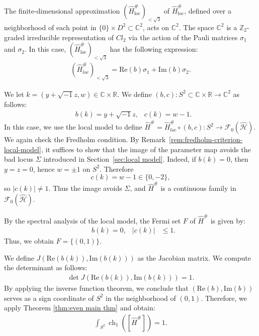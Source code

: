 \documentclass{amsart}
\theoremstyle{definition}
\theoremstyle{remark}
\begin{document}
The finite-dimensional approximation $(\hat{H}^{\#}_{\mathrm{loc}})_{<\sqrt{3}}$ of $\hat{H}^{\#}_{\mathrm{loc}}$, defined over a neighborhood of each point in $\{0\} \times D^2 \subset \mathbb{C}^2$, acts on $\mathbb{C}^2$. The space $\mathbb{C}^2$ is a $\mathbb{Z}_2$-graded irreducible representation of $Cl_2$ via the action of the Pauli matrices $\sigma_1$ and $\sigma_2$. In this case, $(\hat{H}^{\#}_{\mathrm{loc}})_{<\sqrt{3}}$ has the following expression:
\begin{align*}
    (\hat{H}^{\#}_{loc})_{<\sqrt{3}} = \text{Re}(b) \sigma_1 + \text{Im}(b) \sigma_2.
\end{align*}

We let $k = (y + \sqrt{-1} z, w) \in \mathbb{C} \times \mathbb{R}$.
We define $(b, c) \colon S^2 \subset \mathbb{C} \times \mathbb{R} \to \mathbb{C}^2$ as follows:
\begin{align*}
    &b(k) = y + \sqrt{-1} z, &c(k) = w - 1.
\end{align*}
In this case, we use the local model to define $\hat{H}^{\#} = \hat{H}^{\#}_{loc} \circ (b, c) \colon S^2 \to \mathcal{F}_0(\hat{\mathcal{H}})$.
We again check the Fredholm condition.
By Remark~\ref{rem:fredholm-criterion-local-model}, it suffices to show that the image of
the parameter map avoids the bad locus $\Sigma$ introduced in Section~\ref{sec:local model}.
Indeed, if $b(k)=0$, then $y=z=0$, hence $w=\pm 1$ on $S^2$.
Therefore
\[
c(k)=w-1\in\{0,-2\},
\]
so $|c(k)|\neq 1$.
Thus the image avoids $\Sigma$, and $\hat H^\#$ is a continuous family in
$\mathcal F_0(\hat{\mathcal H})$.

By the spectral analysis of the local model, the Fermi set $F$ of $\hat{H}^{\#}$ is given by:
\begin{align*}
    &b(k)= 0, &\lvert c(k) \rvert &\leq 1.
\end{align*}
Thus, we obtain $F = \{(0, 1)\}$.

We define $J(\text{Re}(b(k)), \text{Im}(b(k)))$ as the Jacobian matrix.
We compute the determinant as follows:
\begin{align*}
    \det J(\text{Re}(b(k)), \text{Im}(b(k))) = 1.
\end{align*}
By applying the inverse function theorem, we conclude that $(\text{Re}(b), \text{Im}(b))$ serves as a sign coordinate of $S^2$ in the neighborhood of $(0, 1)$.
Therefore, we apply Theorem \ref{thm:even main thm} and obtain:
\begin{align*}
    \int_{S^2} \operatorname{ch}_{1}([\hat{H}^{\#}]) = 1.
\end{align*}
\end{document}
